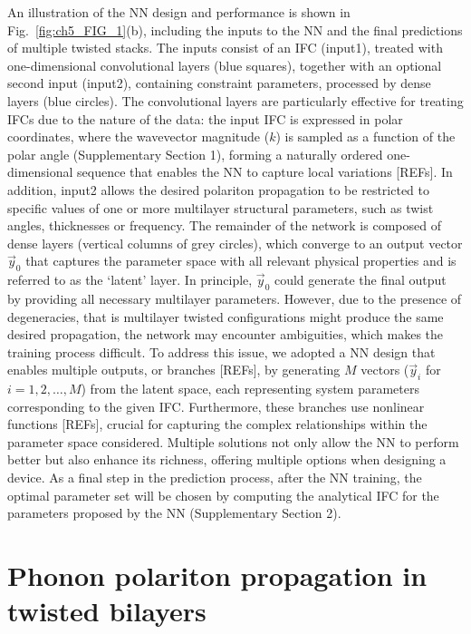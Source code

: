 An illustration of the NN design and performance is shown in Fig.~\ref{fig:ch5_FIG_1}(b), including the inputs to the NN and the final predictions of multiple twisted stacks. The inputs consist of an IFC (input1), treated with one-dimensional convolutional layers (blue squares), together with an optional second input (input2), containing constraint parameters, processed by dense layers (blue circles). The convolutional layers are particularly effective for treating IFCs due to the nature of the data: the input IFC is expressed in polar coordinates, where the wavevector magnitude ($k$) is sampled as a function of the polar angle (Supplementary Section 1), forming a naturally ordered one-dimensional sequence that enables the NN to capture local variations [REFs]. In addition, input2 allows the desired polariton propagation to be restricted to specific values of one or more multilayer structural parameters, such as twist angles, thicknesses or frequency. The remainder of the network is composed of dense layers (vertical columns of grey circles), which converge to an output vector $\vec{y}_{0}$ that captures the parameter space with all relevant physical properties and is referred to as the `latent' layer. In principle, $\vec{y}_{0}$ could generate the final output by providing all necessary multilayer parameters. However, due to the presence of degeneracies, that is multilayer twisted configurations might produce the same desired propagation, the network may encounter ambiguities, which makes the training process difficult. To address this issue, we adopted a NN design that enables multiple outputs, or branches [REFs], by generating $M$ vectors ($\vec{y}_{i}$ for $i=1,2,\ldots,M$) from the latent space, each representing system parameters corresponding to the given IFC. Furthermore, these branches use nonlinear functions [REFs], crucial for capturing the complex relationships within the parameter space considered. Multiple solutions not only allow the NN to perform better but also enhance its richness, offering multiple options when designing a device. As a final step in the prediction process, after the NN training, the optimal parameter set will be chosen by computing the analytical IFC for the parameters proposed by the NN (Supplementary Section 2).


\section{Phonon polariton propagation in twisted bilayers}\label{sec:ch5_bilayers}

